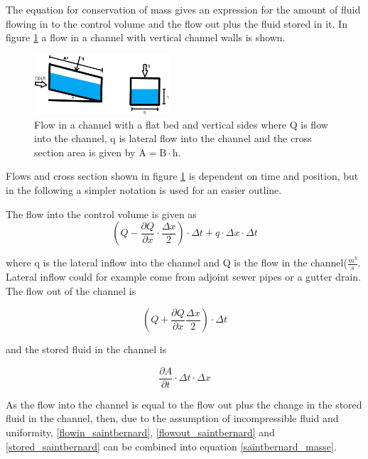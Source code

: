 The equation for conservation of mass gives an expression for the amount of fluid flowing in to the control volume and the flow out plus the fluid stored in it.
In figure \ref{fig:firkant_kloak} a flow in a channel with vertical channel walls is shown.

\begin{figure}[H]
\centering
\includegraphics[width=0.45\textwidth]{report/modeling/pictures/firkant_kloak.png}
\caption{Flow in a channel with a flat bed and vertical sides where Q is flow into the channel, q is lateral flow into the channel and the cross section area is given by $\text{A} = \text{B} \cdot \text{h}$. }
\label{fig:firkant_kloak}
\end{figure}

Flows and cross section shown in figure \ref{fig:firkant_kloak} is dependent on time and position, but in the following a simpler notation is used for an easier outline. 

The flow into the control volume is given as
\begin{equation}
	\left(Q - \frac{\partial Q}{\partial x}\cdot \frac{\Delta x}{2}\right) \cdot \Delta t + q \cdot \Delta x \cdot \Delta t
\label{flowin_saintbernard}
\end{equation}

where q is the lateral inflow into the channel and Q is the flow in the channel($\frac{m^3}{s}$. Lateral inflow could for example come from adjoint sewer pipes or a gutter drain.
The flow out of the channel is

\begin{equation}
\left(Q + \frac{\partial Q}{ \partial x} \frac{\Delta x}{2} \right) \cdot \Delta t 
\label{flowout_saintbernard}
\end{equation}

and the stored fluid in the channel is

\begin{equation}
\frac{\partial A}{\partial t}\cdot \Delta t \cdot \Delta x	
\label{stored_saintbernard}
\end{equation}

As the flow into the channel is equal to the flow out plus the change in the stored fluid in the channel, then, due to the assumption of incompressible fluid and uniformity, \ref{flowin_saintbernard}, \ref{flowout_saintbernard} and \ref{stored_saintbernard} can be combined into equation \ref{saintbernard_masse}. 

